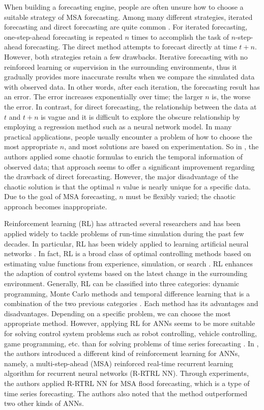 When building a forecasting engine, people are often unsure how to choose a suitable strategy of MSA forecasting. Among many different strategies, iterated forecasting and direct forecasting are quite common \cite{ANN:ref_32,ANN:ref_33}. For iterated forecasting, one-step-ahead forecasting is repeated $n$ times to accomplish the task of $n$-step-ahead forecasting. The direct method attempts to forecast directly at time $t+n$. However, both strategies retain a few drawbacks. Iterative forecasting with no reinforced learning or supervision in the surrounding environments, thus it gradually provides more inaccurate results when we compare the simulated data with observed data. In other words, after each iteration, the forecasting result has an error. The error increases exponentially over time; the larger $n$ is, the worse the error. In contrast, for direct forecasting, the relationship between the data at $t$ and $t+n$ is vague and it is difficult to explore the obscure relationship by employing a regression method such as a neural network model. In many practical applications, people usually encounter a problem of how to choose the most appropriate $n$, and most solutions are based on experimentation. So in \cite{ANN:ref_05,ANN:ref_07,ANN:ref_17}, the authors applied some chaotic formulas to enrich the temporal information of observed data; that approach seems to offer a significant improvement regarding the drawback of direct forecasting. However, the major disadvantage of the chaotic solution is that the optimal $n$ value is nearly unique for a specific data. Due to the goal of MSA forecasting, $n$ must be flexibly varied; the chaotic approach becomes inappropriate.

Reinforcement learning (RL) has attracted several researchers and has been applied widely to tackle problems of run-time simulation during the past few decades. In particular, RL has been widely applied to learning artificial neural networks \cite{rein:ref_01,rein:ref_02,rein:ref_03}. In fact, RL is a broad class of optimal controlling methods based on estimating value functions from experience, simulation, or search \cite{rein:ref_04}. RL enhances the adaption of control systems based on the latest change in the surrounding environment. Generally, RL can be classified into three categories: dynamic programming, Monte Carlo methods and temporal difference learning that is a combination of the two previous categories \cite{rein:ref_05}. Each method has its advantages and disadvantages. Depending on a specific problem, we can choose the most appropriate method. However, applying RL for ANNs seems to be more suitable for solving control system problems such as robot controlling, vehicle controlling, game programming, etc. than for solving problems of time series forecasting \cite{rein:ref_06,rein:ref_07}. In \cite{rein:ref_01}, the authors introduced a different kind of reinforcement learning for ANNs, namely, a multi-step-ahead (MSA) reinforced real-time recurrent learning algorithm for recurrent neural networks (R-RTRL NN). Through experiments, the authors applied R-RTRL NN for MSA flood forecasting, which is a type of time series forecasting. The authors also noted that the method outperformed two other kinds of ANNs. 